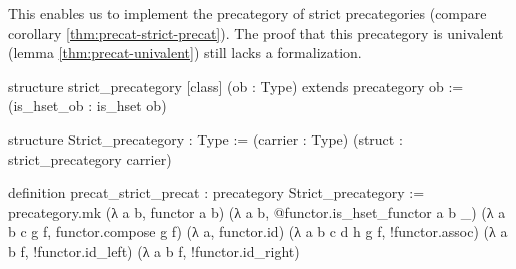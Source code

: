This enables us to implement the precategory of strict precategories (compare
corollary \ref{thm:precat-strict-precat}).
The proof that this precategory is univalent (lemma \ref{thm:precat-univalent})
still lacks a formalization.

\begin{leancode}
structure strict_precategory [class] (ob : Type) extends precategory ob :=
  (is_hset_ob : is_hset ob)

structure Strict_precategory : Type :=
  (carrier : Type)
  (struct : strict_precategory carrier)

definition precat_strict_precat : precategory Strict_precategory :=
precategory.mk (λ a b, functor a b)
  (λ a b, @functor.is_hset_functor a b _)
  (λ a b c g f, functor.compose g f)
  (λ a, functor.id)
  (λ a b c d h g f, !functor.assoc)
  (λ a b f, !functor.id_left)
  (λ a b f, !functor.id_right)
\end{leancode}

